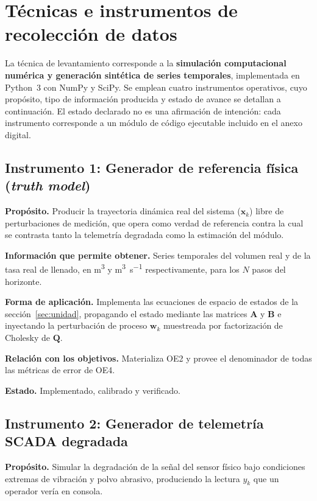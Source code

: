 \section{Técnicas e instrumentos de recolección de datos}
\label{sec:tecnicas}

La técnica de levantamiento corresponde a la \textbf{simulación computacional
numérica y generación sintética de series temporales}, implementada en Python~3
con NumPy y SciPy. Se emplean cuatro instrumentos operativos, cuyo propósito,
tipo de información producida y estado de avance se detallan a continuación. El
estado declarado no es una afirmación de intención: cada instrumento corresponde
a un módulo de código ejecutable incluido en el anexo digital.

\subsection{Instrumento 1: Generador de referencia física (\emph{truth model})}

\textbf{Propósito.} Producir la trayectoria dinámica real del sistema
($\mathbf{x}_{k}$) libre de perturbaciones de medición, que opera como verdad de
referencia contra la cual se contrasta tanto la telemetría degradada como la
estimación del módulo.

\textbf{Información que permite obtener.} Series temporales del volumen real y
de la tasa real de llenado, en \si{\metre\cubed} y
\si{\metre\cubed\per\second} respectivamente, para los $N$ pasos del horizonte.

\textbf{Forma de aplicación.} Implementa las ecuaciones de espacio de estados de
la sección~\ref{sec:unidad}, propagando el estado mediante las matrices
$\mathbf{A}$ y $\mathbf{B}$ e inyectando la perturbación de proceso
$\mathbf{w}_{k}$ muestreada por factorización de Cholesky de $\mathbf{Q}$.

\textbf{Relación con los objetivos.} Materializa OE2 y provee el denominador de
todas las métricas de error de OE4.

\textbf{Estado.} Implementado, calibrado y verificado.

\subsection{Instrumento 2: Generador de telemetría SCADA degradada}

\textbf{Propósito.} Simular la degradación de la señal del sensor físico bajo
condiciones extremas de vibración y polvo abrasivo, produciendo la lectura
$y_{k}$ que un operador vería en consola.

